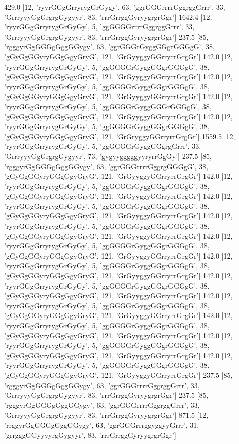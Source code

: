 429.0 [12, 'ryyrGGgGrryrygGrGygy', 63, 'ggrGGGrrrrGggrggGrrr', 33, 'GrrryyyGgGrgrgGygyyr', 83, 'rrrGrrggGyryygrgrGgr']
1642.4 [12, 'ryyrGGgGrryrygGrGyGy', 5, 'ggGGGGrrrrGggrggGrrr', 33, 'GrrryyyGgGrgrgGygyyr', 83, 'rrrGrrggGyryygrgrGgr']
237.5 [85, 'rgggyrGgGGGgGggGGygy', 63, 'ggrGGGrGyggGGgrGGGgG', 38, 'gGyGgGGyryGGgGgyGryG', 121, 'GrGyyggyGGrryrrGrgGr']
142.0 [12, 'ryyrGGgGrryrygGrGyGy', 5, 'ggGGGGrGyggGGgrGGGgG', 38, 'gGyGgGGyryGGgGgyGryG', 121, 'GrGyyggyGGrryrrGrgGr']
142.0 [12, 'ryyrGGgGrryrygGrGyGy', 5, 'ggGGGGrGyggGGgrGGGgG', 38, 'gGyGgGGyryGGgGgyGryG', 121, 'GrGyyggyGGrryrrGrgGr']
142.0 [12, 'ryyrGGgGrryrygGrGyGy', 5, 'ggGGGGrGyggGGGrGGGgG', 38, 'gGyGgGGyryGGgGgyGryG', 121, 'GrGyyggyGGrryrrGrgGr']
142.0 [12, 'ryyrGGgGrryrygGrGyGy', 5, 'ggGGGGrGyggGGgrGGGgG', 38, 'gGyGgGGyryGGgGgyGryG', 121, 'GrGryggyGGrryrrGrgGr']
1559.5 [12, 'ryyrGGgGrryrygGrGyGy', 5, 'ggGGGGrGyggGGgrgGrrr', 33, 'GrrryyyGgGrgrgGygyyr', 73, 'gygyygggggyyryrrGgGy']
237.5 [85, 'rgggyrGgGGGgGggGGygy', 63, 'ggrGGGrrrrGggrgGGGgG', 38, 'gGyGgGGyryGGgGgyGryG', 121, 'GrGyyggyGGrryrrGrgGr']
142.0 [12, 'ryyrGGgGrryrygGrGyGy', 5, 'ggGGGGrGyggGGgrGGGgG', 38, 'gGyGgGGyryGGgGgyGryG', 121, 'GrGyyggyGGrryrrGrgGr']
142.0 [12, 'ryyrGGgGrryrygGrGyGy', 5, 'ggGGGGrGyggGGgrGGGgG', 38, 'gGyGgGGyryGGgGgyGryG', 121, 'GrGyyggyGGrryrrGrgGr']
142.0 [12, 'ryyrGGgGrryrygGrGyGy', 5, 'ggGGGGrGyggGGgrGGGgG', 38, 'gGyGgGGyryGGgGgyGryG', 121, 'GrGyyggyGGrryrrGrgGr']
142.0 [12, 'ryyrGGgGrryrygGrGyGy', 5, 'ggGGGGrGyggGGgrGGGgG', 38, 'gGyGgGGyryGGgGgyGryG', 121, 'GrGyyggyGGrryrrGrgGr']
142.0 [12, 'ryyrGGgGrryrygGrGyGy', 5, 'ggGGGGrGyggGGgrGGGgG', 38, 'gGyGgGGyryGGgGgyGryG', 121, 'GrGyyggyGGrryrrGrgGr']
142.0 [12, 'ryyrGGgGrryrygGrGyGy', 5, 'ggGGGGrGyggGGgrGGGgG', 38, 'gGyGgGGyryGGgGgyGryG', 121, 'GrGyyggyGGrryrrGrgGr']
142.0 [12, 'ryyrGGgGrryrygGrGyGy', 5, 'ggGGGGrGyggGGgrGGGgG', 38, 'gGyGgGGyryGGgGgyGryG', 121, 'GrGyyggyGGrryrrGrgGr']
142.0 [12, 'ryyrGGgGrryrygGrGyGy', 5, 'ggGGGGrGyggGGgrGGGgG', 38, 'gGyGgGGyryGGgGgyGryG', 121, 'GrGyyggyGGrryrrGrgGr']
142.0 [12, 'ryyrGGgGrryrygGrGyGy', 5, 'ggGGGGrGyggGGgrGGGgG', 38, 'gGyGgGGyryGGgGgyGryG', 121, 'GrGyyggyGGrryrrGrgGr']
142.0 [12, 'ryyrGGgGrryrygGrGyGy', 5, 'ggGGGGrGyggGGgrGGGgG', 38, 'gGyGgGGyryGGgGgyGryG', 121, 'GrGyyggyGGrryrrGrgGr']
237.5 [85, 'rgggyrGgGGGgGggGGygy', 63, 'ggrGGGrrrrGggrggGrrr', 33, 'GrrryyyGgGrgrgGygyyr', 83, 'rrrGrrggGyryygrgrGgr']
237.5 [85, 'rgggyrGgGGGgGggGGygy', 63, 'ggrGGGrrrrGggrggGrrr', 33, 'GrrryyyGgGrgrgGygyyr', 83, 'rrrGrrggGyryygrgrGgr']
871.5 [12, 'rrggyrGgGGGgGggGGygy', 63, 'ggrGGGrrrggyggyyGrrr', 31, 'grrgggGGyyyyrgGygyyr', 83, 'rrrGrrggGyryygrgrGgr']
